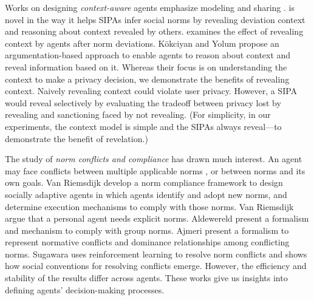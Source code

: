Works on designing \emph{context-aware} agents emphasize modeling \citep{Murukannaiah-AAMAS14-Xipho} and sharing \citep{Ajmeri-AAMAS17-Arnor}. 
\frameworkB is novel in the way it helps SIPAs infer social norms by 
revealing deviation context and reasoning about context revealed by others. \frameworkB
examines the effect of revealing context by agents after norm
deviations. K{\"o}kciyan and Yolum  
propose an argumentation-based approach to enable agents to reason about context and reveal information based on it. Whereas their focus is on understanding the context to make a privacy decision, we demonstrate the benefits of revealing context. 
%
Naively revealing context could violate user privacy. However, a SIPA 
would reveal selectively by evaluating the tradeoff between privacy lost by revealing and sanctioning faced by not revealing. (For simplicity, in our experiments, the context model is simple and the SIPAs always reveal---to demonstrate the benefit of revelation.)

The study of \emph{norm conflicts and compliance} has drawn much interest.
An agent may face conflicts between multiple applicable norms \citep{Ajmeri-IJCAI16-Coco}, or 
between norms and its own goals. 
Van Riemsdijk {\etal}  develop a norm compliance
framework to design socially adaptive agents in which agents 
identify and adopt new norms, and determine execution mechanisms to comply with those norms. 
Van Riemsdijk {\etal} argue that a personal agent needs explicit norms. 
Aldewereld {\etal}  present a formalism and mechanism to
comply with group norms. Ajmeri {\etal}  present a formalism to represent normative conflicts and dominance relationships among conflicting norms.  
Sugawara  uses
reinforcement learning to resolve norm conflicts and shows how social conventions
for resolving conflicts emerge. However, the efficiency and stability of the results
differ across agents. These works give us insights into defining agents'
decision-making processes.

